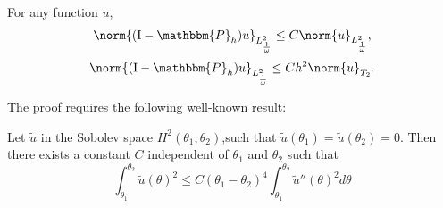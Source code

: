 \documentclass[a4paper]{article}
\begin{document}
\begin{Lem}
	For any function $u$, 
	\[\norm{(\textup{I} - \mathbbm{P}_h)u}_{L^2_\frac{1}{\omega}} \leq C\norm{u}_{L^{2}_\frac{1}{\omega}},\]
	\[\norm{(\textup{I} - \mathbbm{P}_h)u}_{L^2_\frac{1}{\omega}}  \leq C h^2 \norm{u}_{T_2}.\]
	\label{PhT0T2}
\end{Lem}
\noindent The proof requires the following well-known result:
\begin{Lem}
	\label{LemH2NulAuBord}
	Let $\tilde{u}$ in the Sobolev space $H^2(\theta_1,\theta_2)$,such that $\tilde{u}(\theta_1) = \tilde{u}(\theta_2) = 0$. Then there exists a constant $C$ independent of $\theta_1$ and $\theta_2$ such that 
	\[ \int_{\theta_1}^{\theta_2} \tilde{u}(\theta)^2 \leq C(\theta_1-\theta_2)^4 \int_{\theta_1}^{\theta_2} \tilde{u}''(\theta)^2 d\theta\]
\end{Lem}
\end{document}
